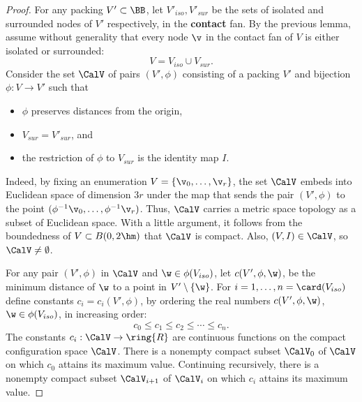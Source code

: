 \begin{proof} For any packing $V'\subset \BB$, let $V'_{iso},V'_{sur}$
  be the sets of isolated and surrounded nodes of $V'$
  respectively, in the {\bf contact} fan.  By the previous lemma,
  assume without generality that every node $\v$ in the contact fan
  of $V$ is either isolated or surrounded:
\begin{displaymath}
V = V_{iso} \cup V_{sur}.
\end{displaymath}
Consider the set $\CalV$ of pairs $(V',\phi)$ consisting of a packing $V'$
and bijection $\phi:V\to V'$ such that
\begin{itemize}
\item $\phi$ preserves distances from the origin, 
\item $V_{sur}=V'_{sur}$, and 
\item the restriction of $\phi$ to $V_{sur}$ is the identity map $I$.
\end{itemize}
%

Indeed, by fixing an enumeration $V = \{\v_0,\ldots,\v_r\}$, the set
$\CalV$ embeds into Euclidean space of dimension $3r$ under the map
that sends the pair $(V',\phi)$ to the point
$(\phi^{-1}\v_0,\ldots,\phi^{-1}\v_r)$.  Thus, $\CalV$ carries a
metric space topology as a subset of Euclidean space.  With a little
argument, it follows from the boundedness of $V\subset B(0,2\hm)$ that
$\CalV$ is compact.  Also, $(V,I)\in \CalV$, so $\CalV\ne\emptyset$.


For any pair $(V',\phi)$ in $\CalV$ and $\w\in \phi(V_{iso})$, let
$c(V',\phi,\w)$, be the minimum distance of $\w$ to a point in
$V'\setminus \{\w\}$.  For $i=1,\ldots,n=\card(V_{iso})$ define
constants $c_i=c_i(V',\phi)$, by ordering the real numbers
$c(V',\phi,\w)$, $\w\in\phi(V_{iso})$, in increasing order:
\begin{displaymath}
c_0 \le c_1 \le c_2 \le \cdots \le c_n.
\end{displaymath}
The constants $c_i:\CalV\to\ring{R}$ are continuous functions on the
compact configuration space $\CalV$.  There is a nonempty compact
subset $\CalV_0$ of $\CalV$ on which $c_0$ attains its maximum
value. Continuing recursively, there is a nonempty compact subset
$\CalV_{i+1}$ of $\CalV_{i}$ on which $c_i$ attains its maximum value.
%
%


\end{proof}
